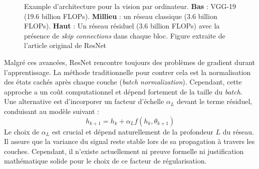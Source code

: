 \begin{figure}[htbp]
    \centering
    \caption{Example d'architecture pour la vision par ordinateur. \textbf{Bas} : VGG-19 (19.6 billion FLOPs). \textbf{Millieu} : un réseau classique (3.6 billion FLOPs). \textbf{Haut} : Un réseau résiduel (3.6 billion FLOPs) avec la présence de \textit{skip connections} dans chaque bloc. Figure extraite de l'article original de ResNet \citep{resnet}}
    \label{fig:resnet}
\end{figure}

Malgré ces avancées, ResNet rencontre toujours des problèmes de gradient durant l'apprentissage. La méthode traditionnelle pour contrer cela est la normalisation des états cachés après chaque couche (\textit{batch normalization}). Cependant, cette approche a un coût computationnel et dépend fortement de la taille du \textit{batch}. Une alternative est d'incorporer un facteur d'échelle $\alpha_L$ devant le terme résiduel, conduisant au modèle suivant :
\begin{equation}\label{resnet_equation}
    h_{k+1} = h_k + \alpha_L f(h_k, \theta_{k+1})
\end{equation}
Le choix de $\alpha_L$ est crucial et dépend naturellement de la profondeur $L$ du réseau. Il assure que la variance du signal reste stable lors de sa propagation à travers les couches. Cependant, il n'existe actuellement ni preuve formelle ni justification mathématique solide pour le choix de ce facteur de régularisation.

